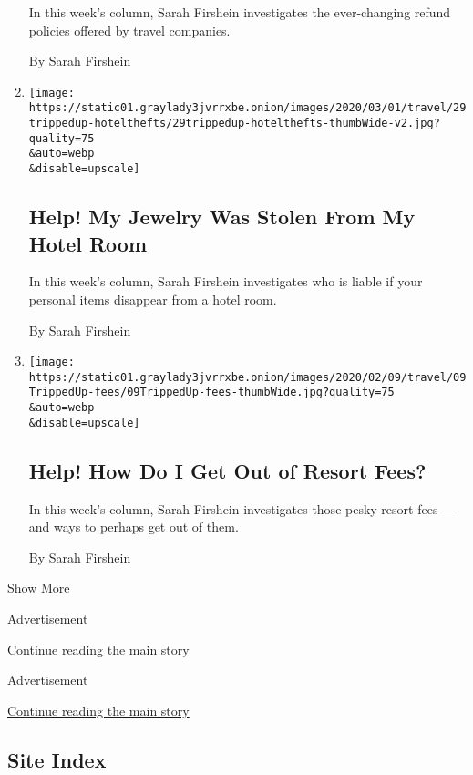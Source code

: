 \begin{enumerate}
  In this week's column, Sarah Firshein investigates the ever-changing
  refund policies offered by travel companies.

  By Sarah Firshein
\item
  \href{/2020/02/29/travel/travel-advice-jewelry-stolen-hotels.html}{}

  \texttt{[image: https://static01.graylady3jvrrxbe.onion/images/2020/03/01/travel/29trippedup-hotelthefts/29trippedup-hotelthefts-thumbWide-v2.jpg?quality=75\\\&auto=webp\\\&disable=upscale]}

  \hypertarget{help-my-jewelry-was-stolen-from-my-hotel-room}{%
  \subsection{Help! My Jewelry Was Stolen From My Hotel
  Room}\label{help-my-jewelry-was-stolen-from-my-hotel-room}}

  In this week's column, Sarah Firshein investigates who is liable if
  your personal items disappear from a hotel room.

  By Sarah Firshein
\item
  \href{/2020/02/08/travel/resort-fees.html}{}

  \texttt{[image: https://static01.graylady3jvrrxbe.onion/images/2020/02/09/travel/09TrippedUp-fees/09TrippedUp-fees-thumbWide.jpg?quality=75\\\&auto=webp\\\&disable=upscale]}

  \hypertarget{help-how-do-i-get-out-of-resort-fees}{%
  \subsection{Help! How Do I Get Out of Resort
  Fees?}\label{help-how-do-i-get-out-of-resort-fees}}

  In this week's column, Sarah Firshein investigates those pesky resort
  fees --- and ways to perhaps get out of them.

  By Sarah Firshein
\end{enumerate}

Show More

Advertisement

\protect\hyperlink{after-mid1}{Continue reading the main story}

Advertisement

\protect\hyperlink{after-mktg}{Continue reading the main story}

\hypertarget{site-index}{%
\subsection{Site Index}\label{site-index}}

